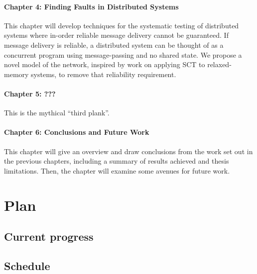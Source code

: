 \documentclass{article}
\begin{document}
\paragraph{Chapter 4: Finding Faults in Distributed Systems} This
chapter will develop techniques for the systematic testing of
distributed systems where in-order reliable message delivery cannot be
guaranteed. If message delivery is reliable, a distributed system can
be thought of as a concurrent program using message-passing and no
shared state. We propose a novel model of the network, inspired by
work on applying SCT to relaxed-memory systems\cite{zhang2015}, to
remove that reliability requirement.

\paragraph{Chapter 5: ???} This is the mythical ``third plank''.

\paragraph{Chapter 6: Conclusions and Future Work} This chapter will
give an overview and draw conclusions from the work set out in the
previous chapters, including a summary of results achieved and thesis
limitations. Then, the chapter will examine some avenues for future
work.

\section{Plan}

\subsection{Current progress}

\subsection{Schedule}



\end{document}
